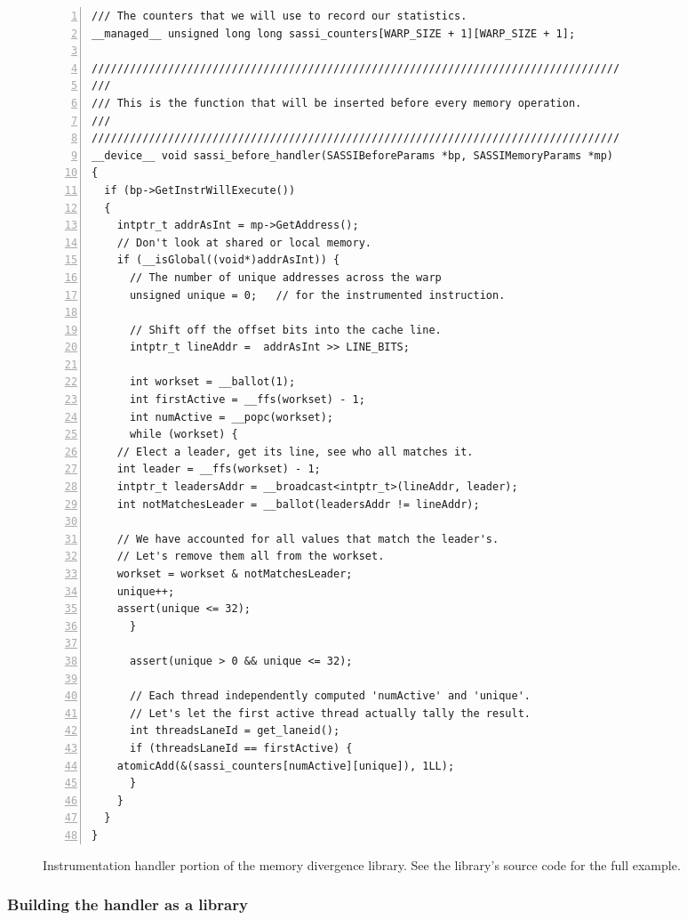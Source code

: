 \begin{figure*}[h!]
\begin{lstlisting}[numbers=left,numbersep=4pt]
/// The counters that we will use to record our statistics.
__managed__ unsigned long long sassi_counters[WARP_SIZE + 1][WARP_SIZE + 1];

///////////////////////////////////////////////////////////////////////////////////
/// 
/// This is the function that will be inserted before every memory operation. 
/// 
///////////////////////////////////////////////////////////////////////////////////
__device__ void sassi_before_handler(SASSIBeforeParams *bp, SASSIMemoryParams *mp)
{
  if (bp->GetInstrWillExecute())
  {
    intptr_t addrAsInt = mp->GetAddress();
    // Don't look at shared or local memory.
    if (__isGlobal((void*)addrAsInt)) { 
      // The number of unique addresses across the warp 
      unsigned unique = 0;   // for the instrumented instruction.

      // Shift off the offset bits into the cache line.
      intptr_t lineAddr =  addrAsInt >> LINE_BITS;

      int workset = __ballot(1);
      int firstActive = __ffs(workset) - 1;
      int numActive = __popc(workset);
      while (workset) {
	// Elect a leader, get its line, see who all matches it.
	int leader = __ffs(workset) - 1;
	intptr_t leadersAddr = __broadcast<intptr_t>(lineAddr, leader);
	int notMatchesLeader = __ballot(leadersAddr != lineAddr);

	// We have accounted for all values that match the leader's.
	// Let's remove them all from the workset.
	workset = workset & notMatchesLeader;
	unique++;
	assert(unique <= 32);
      }

      assert(unique > 0 && unique <= 32);

      // Each thread independently computed 'numActive' and 'unique'.
      // Let's let the first active thread actually tally the result.
      int threadsLaneId = get_laneid();
      if (threadsLaneId == firstActive) {
	atomicAdd(&(sassi_counters[numActive][unique]), 1LL);
      }
    }
  }
}
\end{lstlisting}
\caption{Instrumentation handler portion of the memory divergence
  library.  See the library's source code for the full example.}
\label{fig:handler-example3}
\end{figure*}

\vfill\eject
\subsubsection{Building the handler as a library}

